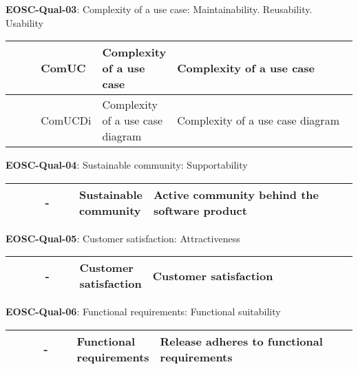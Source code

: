 \textbf{EOSC-Qual-03}: Complexity of a use case: Maintainability. Reusability. Usability
\nopagebreak[4]
\begin{center}
    \tabletail{\hline}
    \tiny
    \begin{supertabular}{|p{0.10\linewidth}|p{0.10\linewidth}|p{0.20\linewidth}|p{0.60\linewidth}|} \hline
        \cite{montagud_systematic_2012} & ComUC & Complexity of a use case & Complexity of a use case\\ \hline
        \cite{montagud_systematic_2012} & ComUCDi & Complexity of a use case diagram & Complexity of a use case diagram\\ \hline
    \end{supertabular}
\end{center}

\textbf{EOSC-Qual-04}: Sustainable community: Supportability
\nopagebreak[4]
\begin{center}
    \tabletail{\hline}
    \tiny
    \begin{supertabular}{|p{0.10\linewidth}|p{0.10\linewidth}|p{0.20\linewidth}|p{0.60\linewidth}|} \hline
        \cite{aberdour_achieving_2007} & - & Sustainable community & Active community behind the software product\\ \hline
    \end{supertabular}
\end{center}

\textbf{EOSC-Qual-05}: Customer satisfaction: Attractiveness
\nopagebreak[4]
\begin{center}
    \tabletail{\hline}
    \tiny
    \begin{supertabular}{|p{0.10\linewidth}|p{0.10\linewidth}|p{0.20\linewidth}|p{0.60\linewidth}|} \hline
        \cite{zuser_software_2005} & - & Customer satisfaction & Customer satisfaction\\ \hline
    \end{supertabular}
\end{center}

\textbf{EOSC-Qual-06}: Functional requirements: Functional suitability
\nopagebreak[4]
\begin{center}
    \tabletail{\hline}
    \tiny
    \begin{supertabular}{|p{0.10\linewidth}|p{0.10\linewidth}|p{0.20\linewidth}|p{0.60\linewidth}|} \hline
        \cite{zuser_software_2005} & - & Functional requirements & Release adheres to functional requirements\\ \hline
    \end{supertabular}
\end{center}

